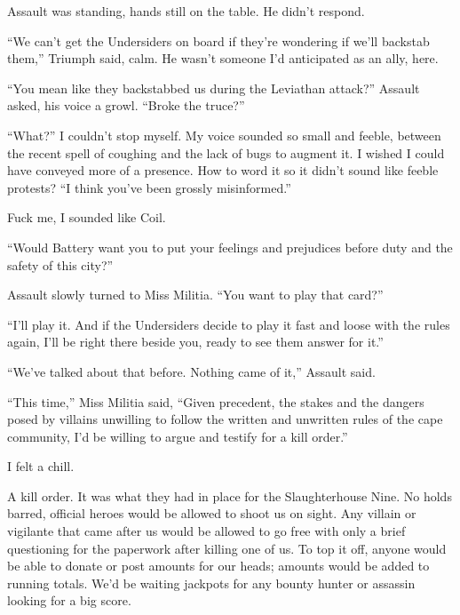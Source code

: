Assault was standing, hands still on the table.  He didn't respond.



``We can't get the Undersiders on board if they're wondering if we'll backstab them,'' Triumph said, calm.  He wasn't someone I'd anticipated as an ally, here.



``You mean like they backstabbed us during the Leviathan attack?'' Assault asked, his voice a growl.  ``Broke the truce?''



``What?'' I couldn't stop myself.  My voice sounded so small and feeble, between the recent spell of coughing and the lack of bugs to augment it.  I wished I could have conveyed more of a presence.  How to word it so it didn't sound like feeble protests?  ``I think you've been\emph{ }grossly misinformed.''



Fuck me, I sounded like Coil.



``Would Battery want you to put your feelings and prejudices before duty and the safety of this city?''



Assault slowly turned to Miss Militia.  ``You want to play that card?''



``I'll play it.  And if the Undersiders decide to play it fast and loose with the rules again, I'll be right there beside you, ready to see them answer for it.''



``We've talked about that before.  Nothing came of it,'' Assault said.



``This time,'' Miss Militia said, ``Given precedent, the stakes and the dangers posed by villains unwilling to follow the written and unwritten rules of the cape community, I'd be willing to argue and testify for a kill order.''



I felt a chill.



A kill order.  It was what they had in place for the Slaughterhouse Nine.  No holds barred, official heroes would be allowed to shoot us on sight.  Any villain or vigilante that came after us would be allowed to go free with only a brief questioning for the paperwork after killing one of us.  To top it off, anyone would be able to donate or post amounts for our heads; amounts would be added to running totals.  We'd be waiting jackpots for any bounty hunter or assassin looking for a big score.



